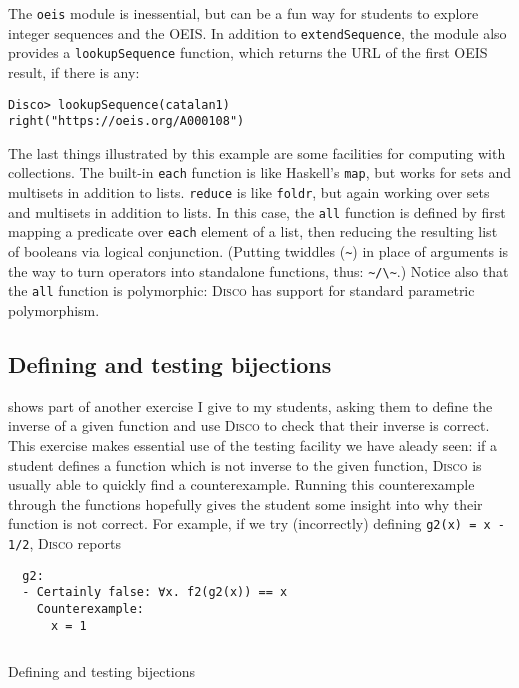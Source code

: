 \documentclass[submission,copyright,creativecommons]{eptcs}
\newcommand{\disco}{\textsc{Disco}\xspace}
\newcommand{\pref}[1]{\prettyref{#1}}
\begin{document}
The \texttt{oeis} module is inessential, but can be a fun way for
students to explore integer sequences and the OEIS.  In addition to
\texttt{extendSequence}, the module also provides a
\texttt{lookupSequence} function, which returns the URL of the first
OEIS result, if there is any:
\begin{verbatim}
Disco> lookupSequence(catalan1)
right("https://oeis.org/A000108")
\end{verbatim}

The last things illustrated by this example are some facilities for
computing with collections.  The built-in \texttt{each} function is
like Haskell's \texttt{map}, but works for sets and multisets in
addition to lists.  \texttt{reduce} is like \texttt{foldr}, but again
working over sets and multisets in addition to lists.  In this case,
the \texttt{all} function is defined by first mapping a predicate over
\texttt{each} element of a list, then reducing the resulting list of
booleans via logical conjunction.  (Putting twiddles (\verb|~|) in
place of arguments is the way to turn operators into standalone
functions, thus: \verb|~/\~|.)  Notice also that the \texttt{all}
function is polymorphic: \disco has support for standard parametric
polymorphism.

\subsection{Defining and testing bijections}

\pref{lst:bijection} shows part of another exercise I give to my
students, asking them to define the inverse of a given function and
use \disco to check that their inverse is correct.  This exercise makes
essential use of the testing facility we have aleady seen: if a
student defines a function which is not inverse to the given function,
\disco is usually able to quickly find a counterexample.  Running
this counterexample through the functions hopefully gives the student
some insight into why their function is not correct.  For example, if
we try (incorrectly) defining \texttt{g2(x) = x - 1/2}, \disco reports
\begin{verbatim}
  g2:
  - Certainly false: ∀x. f2(g2(x)) == x
    Counterexample:
      x = 1
\end{verbatim}

\begin{listing}
  \inputminted{text}{examples/bijection.disco}
  \caption{Defining and testing bijections}
  \label{lst:bijection}
\end{listing}
\end{document}
